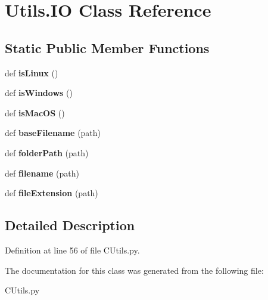 \hypertarget{class_c_utils_1_1_utils_1_1_i_o}{}\section{Utils.\+IO Class Reference}
\label{class_c_utils_1_1_utils_1_1_i_o}
\subsection*{Static Public Member Functions}
\begin{DoxyCompactItemize}
\item 
\mbox{\label{class_c_utils_1_1_utils_1_1_i_o_a49c8b79cf6aee1bf70cc887640d34f01}} 
def {\bfseries is\+Linux} ()
\item 
\mbox{\label{class_c_utils_1_1_utils_1_1_i_o_a6f876defa290a5bcb88d66095e6b28ba}} 
def {\bfseries is\+Windows} ()
\item 
\mbox{\label{class_c_utils_1_1_utils_1_1_i_o_a4b3a65a7a3c6ee98a48ae3d50b83ca09}} 
def {\bfseries is\+Mac\+OS} ()
\item 
\mbox{\label{class_c_utils_1_1_utils_1_1_i_o_a45b5f2052ebfb5870d59f110d8ac2198}} 
def {\bfseries base\+Filename} (path)
\item 
\mbox{\label{class_c_utils_1_1_utils_1_1_i_o_a64979793571e49377e3f9bbb34d32247}} 
def {\bfseries folder\+Path} (path)
\item 
\mbox{\label{class_c_utils_1_1_utils_1_1_i_o_afc6c55c93734ec270301595886fced98}} 
def {\bfseries filename} (path)
\item 
\mbox{\label{class_c_utils_1_1_utils_1_1_i_o_aa7cd6c728820cf77517f4ea722824fe7}} 
def {\bfseries file\+Extension} (path)
\end{DoxyCompactItemize}


\subsection{Detailed Description}


Definition at line 56 of file C\+Utils.\+py.



The documentation for this class was generated from the following file\+:\begin{DoxyCompactItemize}
\item 
C\+Utils.\+py\end{DoxyCompactItemize}
